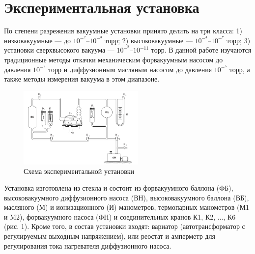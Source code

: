 \documentclass[12pt,a4paper]{article}
\begin{document}
\section{Экспериментальная установка}
По степени разрежения вакуумные установки принято делить на три класса: 1) низковакуумные — до $10^-^2$–$10^-^3$ торр; 2) высоковакуумные — $10^-^4$–$10^-^7$ торр; 3) установки сверхвысокого вакуума — $10^-^8$–$10^{-11}$ торр. В данной работе изучаются традиционные методы откачки механическим форвакуумным насосом до давления $10^-^2$ торр и диффузионным масляным насосом до давления
$10^-^5$ торр, а также методы измерения вакуума в этом диапазоне.
\begin{figure}[h]
    \centering
    \includegraphics[width=0.55\textwidth]{setup.PNG}
    \caption{Схема экспериментальной установки}
    \label{fig:vac}
\end{figure}
Установка изготовлена из стекла и состоит из форвакуумного баллона (ФБ), высоковакуумного диффузионного насоса (ВН), высоковакуумного баллона (ВБ), масляного (М) и ионизационного (И) манометров, термопарных манометров (М1 и M2), форвакуумного насоса (ФН) и соединительных кранов
К1, К2, ..., К6 (рис. 1). Кроме того, в состав установки входят: вариатор
(автотрансформатор с регулируемым выходным напряжением), или реостат
и амперметр для регулирования тока нагревателя диффузионного насоса.
\newpage
\end{document}
